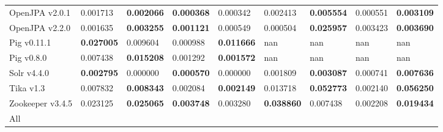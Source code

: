 \begin{table*}[ht]
\begin{tabular}{l|ll|ll||ll|ll}
OpenJPA v2.0.1  & 0.001713 & {\bf 0.002066 } & {\bf 0.000368 } & 0.000342 & 0.002413 & {\bf 0.005554 } & 0.000551 & {\bf 0.003109 } \\
OpenJPA v2.2.0  & 0.001635 & {\bf 0.003255 } & {\bf 0.001121 } & 0.000549 & 0.000504 & {\bf 0.025957 } & 0.003423 & {\bf 0.003690 } \\
Pig v0.11.1  & {\bf 0.027005 } & 0.009604 & 0.000988 & {\bf 0.011666 } & nan & nan & nan & nan \\
Pig v0.8.0  & 0.007438 & {\bf 0.015208 } & 0.001292 & {\bf 0.001572 } & nan & nan & nan & nan \\
Solr v4.4.0  & {\bf 0.002795 } & 0.000000 & {\bf 0.000570 } & 0.000000 & 0.001809 & {\bf 0.003087 } & 0.000741 & {\bf 0.007636 } \\
Tika v1.3  & 0.007832 & {\bf 0.008343 } & 0.002084 & {\bf 0.002149 } & 0.013718 & {\bf 0.052773 } & 0.002140 & {\bf 0.056250 } \\
Zookeeper v3.4.5  & 0.023125 & {\bf 0.025065 } & {\bf 0.003748 } & 0.003280 & {\bf 0.038860 } & 0.007438 & 0.002208 & {\bf 0.019434 } \\
    \midrule
    All                 &               &               &               &               &               &               &               &           \\
    \bottomrule
\end{tabular}
\label{table:mrr:classes}
\end{table*}



